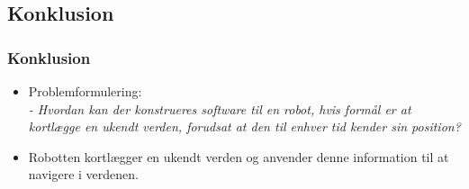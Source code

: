 \subsection{Konklusion}

\begin{frame}
\frametitle{Konklusion}
\begin{itemize}
\item Problemformulering:\\
\textit{- Hvordan kan der konstrueres software til en robot, hvis formål er at kortlægge en ukendt verden, forudsat at den til enhver tid kender sin position?}
\pause
\item Robotten kortlægger en ukendt verden og anvender denne information til at navigere i verdenen.
\end{itemize}
\end{frame}